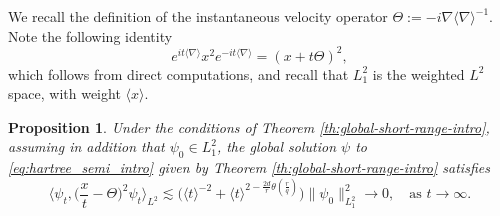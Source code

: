 \documentclass[12pt]{article}
\theoremstyle{plain}
\newtheorem{prop}[theo]{Proposition}
\begin{document}
We recall the definition of the instantaneous velocity operator $\Theta:=-i\nabla\langle\nabla\rangle^{-1}$. Note the following identity 
\begin{equation}\label{eq:b1}
e^{it\langle\nabla\rangle}x^2e^{-it\langle\nabla\rangle}=(x+t\Theta)^2,
\end{equation}
which follows from direct computations, and  recall that $L^2_1$ is the weighted $L^2$ space, with weight $\langle x \rangle$. 


\begin{prop}\label{prop:asympt1}
Under the conditions of Theorem \ref{th:global-short-range-intro}, assuming in addition that $\psi_0\in L^2_1$,  
the global solution $\psi$ to \eqref{eq:hartree_semi_intro} given by Theorem \ref{th:global-short-range-intro} satisfies
\begin{equation*}
\Big\langle\psi_t,\Big(\frac{x}{t}-\Theta\Big)^2\psi_t\Big\rangle_{L^2}\lesssim \big(\langle t\rangle^{-2}+\langle t\rangle^{2-\frac{ 2d}{r}\theta (\frac{r}{q})}\big)\|\psi_0\|^2_{L^2_1} \to 0 , \quad \text{as } t\to\infty.
\end{equation*}
\end{prop}
\end{document}
